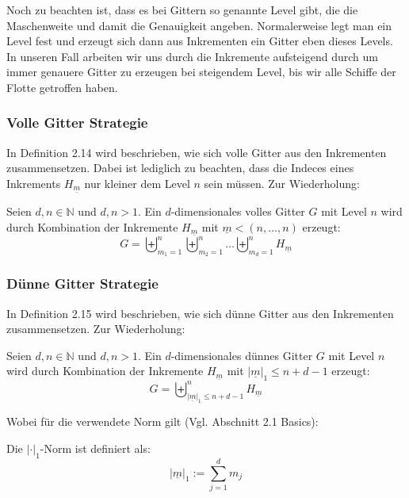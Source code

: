 \documentclass[a4paper,12pt]{llncs}
\numberwithin{equation}{section}
\begin{document}
Noch zu beachten ist, dass es bei Gittern so genannte Level gibt, die die Maschenweite und damit die Genauigkeit angeben. Normalerweise legt man ein Level fest und erzeugt sich dann aus Inkrementen ein Gitter eben dieses Levels. In unseren Fall arbeiten wir uns durch die Inkremente aufsteigend durch um immer genauere Gitter zu erzeugen bei steigendem Level, bis wir alle Schiffe der Flotte getroffen haben.

\subsubsection{Volle Gitter Strategie}

In \cite{M13} Definition 2.14 wird beschrieben, wie sich volle Gitter aus den Inkrementen zusammensetzen. Dabei ist lediglich zu beachten, dass die Indeces eines Inkrements $H_{\underline{m}}$ nur kleiner dem Level $n$ sein müssen.  Zur Wiederholung:

\begin{definition}
	Seien $d,n\in\mathbb{N}$ und $d,n>1$. Ein $d$-dimensionales volles Gitter $G$ mit Level $n$ wird durch Kombination der Inkremente $H_{\underline{m}}$ mit $\underline{m}<(n,\dots,n)$ erzeugt:
	\begin{equation}
		G=\biguplus_{m_1=1}^n\biguplus_{m_2=1}^n\dots \biguplus_{m_d=1}^n H_{\underline{m}}
	\end{equation}
\end{definition}

\subsubsection{Dünne Gitter Strategie}

In \cite{M13} Definition 2.15 wird beschrieben, wie sich dünne Gitter aus den Inkrementen zusammensetzen. Zur Wiederholung:

\begin{definition}
	Seien $d,n\in\mathbb{N}$ und $d,n>1$. Ein $d$-dimensionales dünnes Gitter $G$ mit Level $n$ wird durch Kombination der Inkremente $H_{\underline{m}}$ mit $|\underline{m}|_1\leq n+d-1$ erzeugt:
	\begin{equation}
	G=\biguplus_{|\underline{m}|_1\leq n+d-1}^n H_{\underline{m}}
	\end{equation}
\end{definition}

Wobei für die verwendete Norm gilt (Vgl. \cite{P10} Abschnitt 2.1 Basics):

\begin{definition}
Die  $|\cdot|_1$-Norm ist definiert als:
	\begin{equation}
	|\underline{m}|_1:=\sum_{j=1}^d m_j
	\end{equation}
\end{definition}
\end{document}
